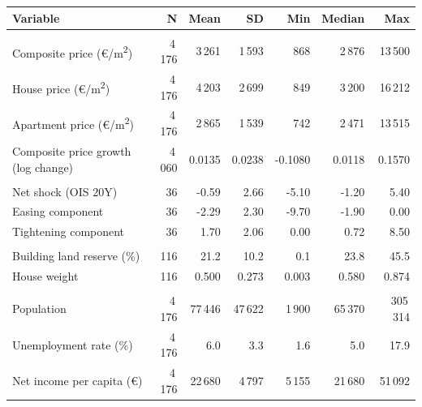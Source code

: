 \begin{tabular}{l r r r r r r}
\toprule
Variable & N & Mean & SD & Min & Median & Max \\
\midrule
\addlinespace
\multicolumn{7}{l}{\itshape Outcome} \\
Composite price (\euro/m\textsuperscript{2}) & 4\,176 & 3\,261 & 1\,593 & 868 & 2\,876 & 13\,500 \\
House price (\euro/m\textsuperscript{2}) & 4\,176 & 4\,203 & 2\,699 & 849 & 3\,200 & 16\,212 \\
Apartment price (\euro/m\textsuperscript{2}) & 4\,176 & 2\,865 & 1\,539 & 742 & 2\,471 & 13\,515 \\
Composite price growth (log change) & 4\,060 & 0.0135 & 0.0238 & -0.1080 & 0.0118 & 0.1570 \\
\addlinespace
\multicolumn{7}{l}{\itshape Monetary policy shock} \\
Net shock (OIS 20Y) & 36 & -0.59 & 2.66 & -5.10 & -1.20 & 5.40 \\
Easing component & 36 & -2.29 & 2.30 & -9.70 & -1.90 & 0.00 \\
Tightening component & 36 & 1.70 & 2.06 & 0.00 & 0.72 & 8.50 \\
\addlinespace
\multicolumn{7}{l}{\itshape Supply measure} \\
Building land reserve (\%) & 116 & 21.2 & 10.2 & 0.1 & 23.8 & 45.5 \\
House weight & 116 & 0.500 & 0.273 & 0.003 & 0.580 & 0.874 \\
\addlinespace
\multicolumn{7}{l}{\itshape Controls} \\
Population & 4\,176 & 77\,446 & 47\,622 & 1\,900 & 65\,370 & 305\,314 \\
Unemployment rate (\%) & 4\,176 & 6.0 & 3.3 & 1.6 & 5.0 & 17.9 \\
Net income per capita (\euro) & 4\,176 & 22\,680 & 4\,797 & 5\,155 & 21\,680 & 51\,092 \\
\bottomrule
\end{tabular}
